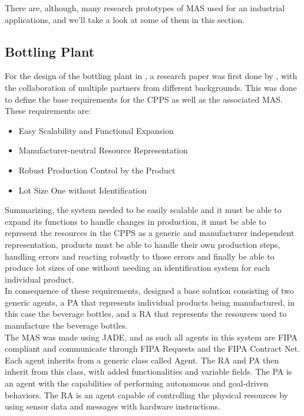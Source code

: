 There are, although, many research prototypes of \gls{MAS} used for an industrial applications, and we'll take a look at some of them in this section.

\subsection{Bottling Plant}
\label{subsec:bottling_plant}

For the design of the bottling plant in \cite{bottling_plant_part2}, a research paper \cite{bottling_plant_part1} was first done by \citeauthor{bottling_plant_part1}, with the collaboration of multiple partners from different backgrounds. This was done to define the base requirements for the \gls{CPPS} as well as the associated \gls{MAS}. These requirements are:

\begin{itemize}
	\item Easy Scalability and Functional Expansion
	\item Manufacturer-neutral Resource Representation
	\item Robust Production Control by the Product
	\item Lot Size One without Identification
\end{itemize}

Summarizing, the system needed to be easily scalable and it must be able to expand its functions to handle changes in production, it must be able to represent the resources in the \gls{CPPS} as a generic and manufacturer independent representation, products must be able to handle their own production steps, handling errors and reacting robustly to those errors and finally be able to produce lot sizes of one without needing an identification system for each individual product.\\

In consequence of these requirements, \citeauthor{bottling_plant_part1} designed a base solution consisting of two generic agents, a \gls{PA} that represents individual products being manufactured, in this case the beverage bottles, and a \gls{RA} that represents the resources used to manufacture the beverage bottles.\\

The \gls{MAS} was made using \gls{JADE}, and as such all agents in this system are \gls{FIPA} compliant and communicate through \gls{FIPA} Requests and the \gls{FIPA} Contract Net.\\

Each agent inherits from a generic class called Agent. The \gls{RA} and \gls{PA} then inherit from this class, with added functionalities and variable fields. The \gls{PA} is an agent with the capabilities of performing autonomous and goal-driven behaviors. The \gls{RA} is an agent capable of controlling the physical resources by using sensor data and messages with hardware instructions.\\

